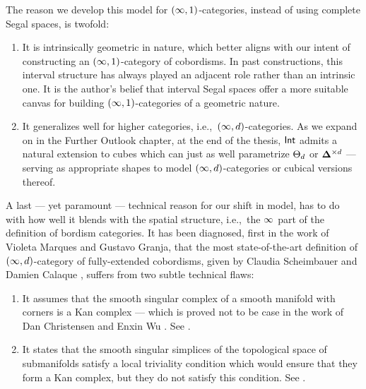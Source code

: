 The reason we develop this model for $(\operatorname{\infty},1)$-categories, instead of using complete Segal spaces, is twofold:
\begin{enumerate}
    \item It is intrinsically geometric in nature, which better aligns with our intent of constructing an $(\operatorname{\infty},1)$-category of cobordisms. In past constructions, this interval structure has always played an adjacent role rather than an intrinsic one. It is the author's belief that interval Segal spaces offer a more suitable canvas for building $(\operatorname{\infty},1)$-categories of a geometric nature.
    \item It generalizes well for higher categories, i.e.,\ $(\operatorname{\infty},d)$-categories. As we expand on in the Further Outlook chapter, at the end of the thesis, $\operatorname{\mathsf{Int}}$ admits a natural extension to cubes which can just as well parametrize $\operatorname{\boldsymbol{\Theta}}_d$ or $\mathbf\Delta^{\times d}$ — serving as appropriate shapes to model $(\operatorname{\infty},d)$-categories or cubical versions thereof.
\end{enumerate}

A last --- yet paramount — technical reason for our shift in model, has to do with how well it blends with the spatial structure, i.e.,\ the $\operatorname{\infty}$ part of the definition of bordism categories. It has been diagnosed, first in the work of Violeta Marques and Gustavo Granja, that the most state-of-the-art definition of $(\operatorname{\infty},d)$-category of fully-extended cobordisms, given by Claudia Scheimbauer and Damien Calaque \cite{CS19}, suffers from two subtle technical flaws: 

\begin{enumerate}
    \item It assumes that the smooth singular complex of a smooth manifold with corners is a Kan complex — which is proved not to be case in the work of Dan Christensen and Enxin Wu \cite{CW}. See \cite[Section~4.1]{CS19}.
    \item It states that the smooth singular simplices of the topological space of submanifolds satisfy a local triviality condition which would ensure that they form a Kan complex, but they do not satisfy this condition. See \cite[Lemma~5.7]{CS19}.
\end{enumerate}

